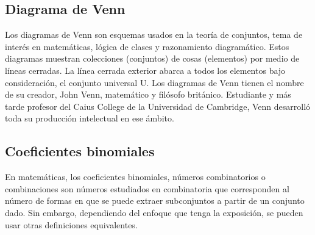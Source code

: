 \subsection{Diagrama de Venn}
Los diagramas de Venn son esquemas usados en la teoría de conjuntos, tema de interés en matemáticas, lógica de clases y razonamiento diagramático. Estos diagramas muestran colecciones (conjuntos) de cosas (elementos) por medio de líneas cerradas. La línea cerrada exterior abarca a todos los elementos bajo consideración, el conjunto universal U. Los diagramas de Venn tienen el nombre de su creador, John Venn, matemático y filósofo británico. Estudiante y más tarde profesor del Caius College de la Universidad de Cambridge, Venn desarrolló toda su producción intelectual en ese ámbito.


\subsection{Coeficientes binomiales}
En matemáticas, los coeficientes binomiales, números combinatorios o combinaciones son números estudiados en combinatoria que corresponden al número de formas en que se puede extraer subconjuntos a partir de un conjunto dado. Sin embargo, dependiendo del enfoque que tenga la exposición, se pueden usar otras definiciones equivalentes. 